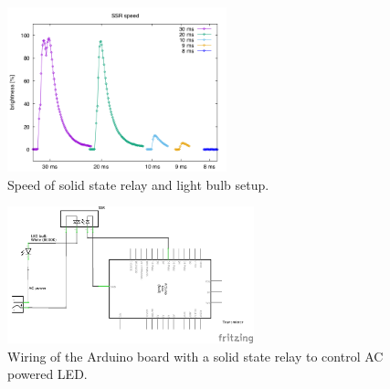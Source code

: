 \begin{figure}[hbt]
\centering
  \includegraphics[height=180px]{img/ssr}
  \caption{Speed of solid state relay and light bulb setup.}
  \label{fig:ssrwarmup}
\end{figure}

\begin{figure}[hbt]
\centering
  \includegraphics[height=150px]{img/ssr_schem}
  \caption{Wiring of the Arduino board with a solid state relay to control AC powered LED.}
  \label{fig:ssrwiring}
\end{figure}

